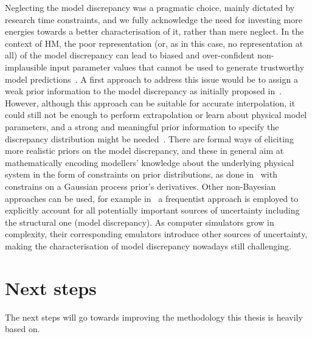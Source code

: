 \vspace{0.2cm}
Neglecting the model discrepancy was a pragmatic choice, mainly dictated by research time constraints, and we fully acknowledge the need for investing more energies towards a better characterisation of it, rather than mere neglect. In the context of HM, the poor representation (or, as in this case, no representation at all) of the model discrepancy can lead to biased and over-confident non-implausible input parameter values that cannot be used to generate trustworthy model predictions~\cite{Volodina:2021}. A first approach to address this issue would be to assign a weak prior information to the model discrepancy as initially proposed in~\cite{Kennedy:2001}. However, although this approach can be suitable for accurate interpolation, it could still not be enough to perform extrapolation or learn about physical model parameters, and a strong and meaningful prior information to specify the discrepancy distribution might be needed~\cite{Brynjarsdottir:2014}. There are formal ways of eliciting more realistic priors on the model discrepancy, and these in general aim at mathematically encoding modellers' knowledge about the underlying physical system in the form of constraints on prior distributions, as done in~\cite{Brynjarsdottir:2014} with constrains on a Gaussian process prior's derivatives. Other non-Bayesian approaches can be used, for example in~\cite{Wong:2017} a frequentist approach is employed to explicitly account for all potentially important sources of uncertainty including the structural one (model discrepancy). As computer simulators grow in complexity, their corresponding emulators introduce other sources of uncertainty, making the characterisation of model discrepancy nowadays still challenging.


%
%
%
\section{Next steps}\label{sec:ch9next_steps}
The next steps will go towards improving the methodology this thesis is heavily based on.

